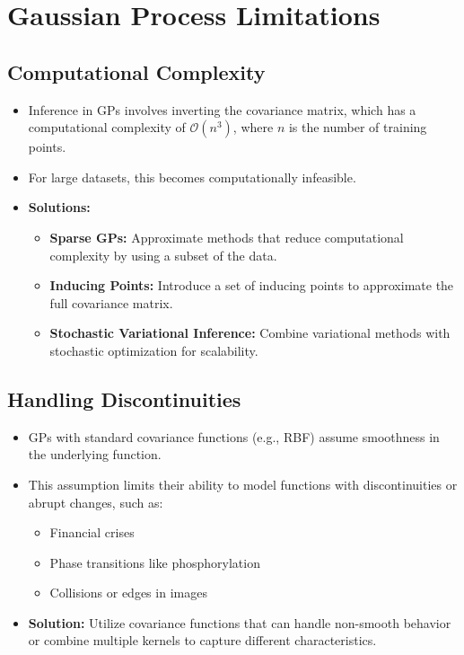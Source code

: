 \documentclass[12pt]{article}
\begin{document}
\section{Gaussian Process Limitations}

\subsection{Computational Complexity}
\begin{itemize}
    \item Inference in GPs involves inverting the covariance matrix, which has a computational complexity of \( \mathcal{O}(n^3) \), where \( n \) is the number of training points.
    \item For large datasets, this becomes computationally infeasible.
    \item \textbf{Solutions:}
    \begin{itemize}
        \item \textbf{Sparse GPs:} Approximate methods that reduce computational complexity by using a subset of the data.
        \item \textbf{Inducing Points:} Introduce a set of inducing points to approximate the full covariance matrix.
        \item \textbf{Stochastic Variational Inference:} Combine variational methods with stochastic optimization for scalability.
    \end{itemize}
\end{itemize}

\subsection{Handling Discontinuities}
\begin{itemize}
    \item GPs with standard covariance functions (e.g., RBF) assume smoothness in the underlying function.
    \item This assumption limits their ability to model functions with discontinuities or abrupt changes, such as:
    \begin{itemize}
        \item Financial crises
        \item Phase transitions like phosphorylation
        \item Collisions or edges in images
    \end{itemize}
    \item \textbf{Solution:} Utilize covariance functions that can handle non-smooth behavior or combine multiple kernels to capture different characteristics.
\end{itemize}
\end{document}
